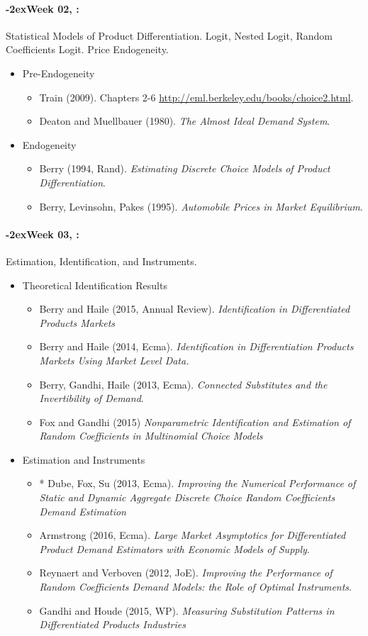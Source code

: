\documentclass[11pt]{article}
\newcommand{\week}[1]{%
  \paragraph*{\kern-2ex\quad #1, \syldate{\today}:}%
  \ifdim\wd1=\wd\THURSDAY
    \AdvanceDate[7]
  \else
    \AdvanceDate[7]
  \fi%
}
\begin{document}
\week{Week 02} Statistical Models of Product Differentiation. Logit, Nested Logit, Random Coefficients Logit. Price Endogeneity.
\begin{itemize}
\item Pre-Endogeneity
\begin{itemize}
\item Train (2009). Chapters 2-6 \url{http://eml.berkeley.edu/books/choice2.html}.
\item Deaton and Muellbauer (1980). \textit{The Almost Ideal Demand System}.
\end{itemize}
\item Endogeneity
\begin{itemize}
\item Berry (1994, Rand). \textit{Estimating Discrete Choice Models of Product Differentiation}. 
\item Berry, Levinsohn, Pakes (1995). \textit{Automobile Prices in Market Equilibrium}.
\end{itemize}
\end{itemize}


\week{Week 03} Estimation, Identification, and Instruments.
\begin{itemize}
\item Theoretical Identification Results
\begin{itemize}
\item Berry and Haile (2015, Annual Review). \textit{Identification in Differentiated Products Markets}
\item Berry and Haile (2014, Ecma). \textit{Identification in Differentiation Products Markets Using Market Level Data.}
\item Berry, Gandhi, Haile (2013, Ecma). \textit{Connected Substitutes and the Invertibility of Demand}.
\item Fox and Gandhi (2015) \textit{Nonparametric Identification and Estimation of Random Coefficients in Multinomial Choice Models}
\end{itemize}
\item Estimation and Instruments
\begin{itemize}
\item * Dube, Fox, Su (2013, Ecma). \textit{Improving the Numerical Performance of Static and Dynamic Aggregate Discrete Choice Random Coefficients Demand Estimation}
\item Armstrong (2016, Ecma). \textit{Large Market Asymptotics for Differentiated Product Demand Estimators with Economic Models of Supply}.
\item Reynaert and Verboven (2012, JoE). \textit{Improving the Performance of Random Coefficients Demand Models: the Role of Optimal Instruments}.
\item Gandhi and Houde (2015, WP). \textit{Measuring Substitution Patterns in Differentiated Products Industries}
\end{itemize}
\end{itemize}
\end{document}
